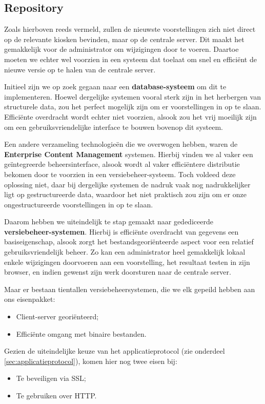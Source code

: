 \subsection{Repository}

Zoals hierboven reeds vermeld, zullen de nieuwste voorstellingen zich niet direct op de relevante kiosken bevinden, maar op de centrale server. Dit maakt het gemakkelijk voor de administrator om wijzigingen door te voeren. Daartoe moeten we echter wel voorzien in een systeem dat toelaat om snel en efficiënt de nieuwe versie op te halen van de centrale server.

Initieel zijn we op zoek gegaan naar een \textbf{database-systeem} om dit te implementeren. Hoewel dergelijke systemen vooral sterk zijn in het herbergen van structurele data, zou het perfect mogelijk zijn om er voorstellingen in op te slaan. Efficiënte overdracht wordt echter niet voorzien, alsook zou het vrij moeilijk zijn om een gebruiksvriendelijke interface te bouwen bovenop dit systeem.

Een andere verzameling technologieën die we overwogen hebben, waren de \textbf{Enterprise Content Management} systemen. Hierbij vinden we al vaker een geïntegreerde beheersinterface, alsook wordt al vaker efficiëntere distributie bekomen door te voorzien in een versiebeheer-systeem. Toch voldeed deze oplossing niet, daar bij dergelijke systemen de nadruk vaak nog nadrukkelijker ligt op gestructureerde data, waardoor het niet praktisch zou zijn om er onze ongestructureerde voorstellingen in op te slaan.

Daarom hebben we uiteindelijk te stap gemaakt naar gedediceerde \textbf{versiebeheer-systemen}. Hierbij is efficiënte overdracht van gegevens een basiseigenschap, alsook zorgt het bestandsgeoriënteerde aspect voor een relatief gebruiksvriendelijk beheer. Zo kan een administrator heel gemakkelijk lokaal enkele wijzigingen doorvoeren aan een voorstelling, het resultaat testen in zijn browser, en indien gewenst zijn werk doorsturen naar de centrale server.

Maar er bestaan tientallen versiebeheersystemen, die we elk gepeild hebben aan ons eisenpakket:
\begin{itemize}
\item Client-server georiënteerd;
\item Efficiënte omgang met binaire bestanden.
\end{itemize}

Gezien de uiteindelijke keuze van het applicatieprotocol (zie onderdeel \ref{sec:applicatieprotocol}), komen hier nog twee eisen bij:
\begin{itemize}
\item Te beveiligen via SSL;
\item Te gebruiken over HTTP.
\end{itemize}

